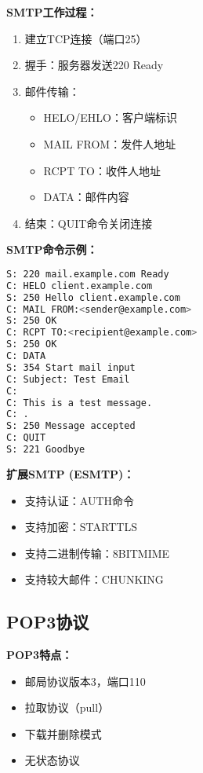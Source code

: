 \documentclass[lang=cn,newtx,10pt,scheme=chinese]{../../elegantbook}
\begin{document}
\textbf{SMTP工作过程：}
\begin{enumerate}
  \item 建立TCP连接（端口25）
  \item 握手：服务器发送220 Ready
  \item 邮件传输：
    \begin{itemize}
      \item HELO/EHLO：客户端标识
      \item MAIL FROM：发件人地址
      \item RCPT TO：收件人地址
      \item DATA：邮件内容
    \end{itemize}
  \item 结束：QUIT命令关闭连接
\end{enumerate}

\textbf{SMTP命令示例：}
\begin{lstlisting}[language=bash,caption={SMTP会话示例}]
S: 220 mail.example.com Ready
C: HELO client.example.com
S: 250 Hello client.example.com
C: MAIL FROM:<sender@example.com>
S: 250 OK
C: RCPT TO:<recipient@example.com>
S: 250 OK
C: DATA
S: 354 Start mail input
C: Subject: Test Email
C: 
C: This is a test message.
C: .
S: 250 Message accepted
C: QUIT
S: 221 Goodbye
\end{lstlisting}

\textbf{扩展SMTP (ESMTP)：}
\begin{itemize}
  \item 支持认证：AUTH命令
  \item 支持加密：STARTTLS
  \item 支持二进制传输：8BITMIME
  \item 支持较大邮件：CHUNKING
\end{itemize}

\subsection{POP3协议}

\textbf{POP3特点：}
\begin{itemize}
  \item 邮局协议版本3，端口110
  \item 拉取协议（pull）
  \item 下载并删除模式
  \item 无状态协议
\end{itemize}
\end{document}

